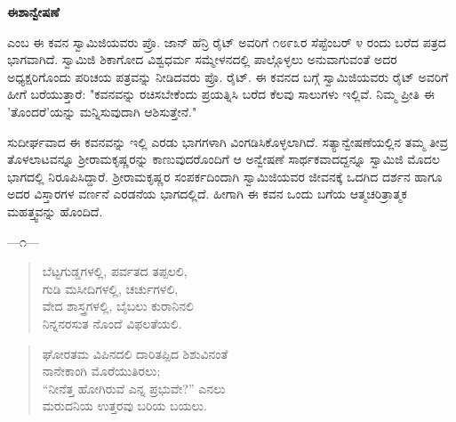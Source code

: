 

\selectkan

\begin{center}
\textbf{ಈಶಾನ್ವೇಷಣೆ}
\end{center}

 ಎಂಬ ಈ ಕವನ ಸ್ವಾಮಿಜಿಯವರು ಪ್ರೊ. ಜಾನ್ ಹೆನ್ರಿ ರೈಟ್ ಅವರಿಗೆ ೧೮೯೩ರ ಸೆಪ್ಟೆಂಬರ್ ೪ ರಂದು ಬರೆದ ಪತ್ರದ ಭಾಗವಾಗಿದೆ. ಸ್ವಾಮಿಜಿ ಶಿಕಾಗೋದ ವಿಶ್ವಧರ್ಮ ಸಮ್ಮೇಳನದಲ್ಲಿ ಪಾಲ್ಗೊಳ್ಳಲು ಅನುವಾಗುವಂತೆ ಅದರ ಅಧ್ಯಕ್ಷರಿಗೊಂದು ಪರಿಚಯ ಪತ್ರವನ್ನು ನೀಡಿದವರು ಪ್ರೊ. ರೈಟ್. ಈ ಕವನದ ಬಗ್ಗೆ ಸ್ವಾಮಿಜಿಯವರು ರೈಟ್ ಅವರಿಗೆ ಹೀಗೆ ಬರೆಯುತ್ತಾರೆ: "ಕವನವನ್ನು ರಚಿಸಬೇಕೆಂದು ಪ್ರಯತ್ನಿಸಿ ಬರೆದ ಕೆಲವು ಸಾಲುಗಳು ಇಲ್ಲಿವೆ. ನಿಮ್ಮ ಪ್ರೀತಿ ಈ 'ತೊಂದರೆ'ಯನ್ನು ಮನ್ನಿಸುವುದಾಗಿ ಆಶಿಸುತ್ತೇನೆ."

ಸುದೀರ್ಘವಾದ ಈ ಕವನವನ್ನು ಇಲ್ಲಿ ಎರಡು ಭಾಗಗಳಾಗಿ ವಿಂಗಡಿಸಿಕೊಳ್ಳಲಾಗಿದೆ. ಸತ್ಯಾನ್ವೇಷಣೆಯಲ್ಲಿನ ತಮ್ಮ ತೀವ್ರ ತೊಳಲಾಟವನ್ನೂ ಶ‍್ರೀರಾಮಕೃಷ್ಣರನ್ನು ಕಾಣುವುದರೊಂದಿಗೆ ಆ ಅನ್ವೇಷಣೆ ಸಾರ್ಥಕವಾದದ್ದನ್ನೂ ಸ್ವಾಮಿಜಿ ಮೊದಲ ಭಾಗದಲ್ಲಿ ನಿರೂಪಿಸಿದ್ದಾರೆ. ಶ‍್ರೀರಾಮಕೃಷ್ಣರ ಸಂಪರ್ಕದಿಂದಾಗಿ ಸ್ವಾಮಿಜಿಯವರ ಜೀವನಕ್ಕೆ ಒದಗಿದ ದರ್ಶನ ಹಾಗೂ ಅದರ ವಿಸ್ತಾರಗಳ ವರ್ಣನೆ ಎರಡನೆಯ ಭಾಗದಲ್ಲಿದೆ. ಹೀಗಾಗಿ ಈ ಕವನ ಒಂದು ಬಗೆಯ ಆತ್ಮಚರಿತ್ರಾತ್ಮಕ ಮಹತ್ತ್ವವನ್ನು ಹೊಂದಿದೆ.

\begin{center}
—೧—
\end{center}

\begin{verse}
ಬೆಟ್ಟಗುಡ್ಡಗಳಲ್ಲಿ, ಪರ್ವತದ ತಪ್ಪಲಲಿ,\\ಗುಡಿ ಮಸೀದಿಗಳಲ್ಲಿ, ಚರ್ಚುಗಳಲಿ,\\ವೇದ ಶಾಸ್ತ್ರಗಳಲ್ಲಿ, ಬೈಬಲು ಕುರಾನಿನಲಿ\\ನಿನ್ನನರಸುತ ನೊಂದೆ ವಿಫಲತೆಯಲಿ.
\end{verse}

\begin{verse}
ಘೋರತಮ ವಿಪಿನದಲಿ ದಾರಿತಪ್ಪಿದ ಶಿಶುವಿನಂತೆ\\ನಾನೇಕಾಂಗಿ ಮೊರೆಯುತಿರಲು;\\“ನೀನೆತ್ತ ಹೋಗಿರುವೆ ಎನ್ನ ಪ್ರಭುವೇ?” ಎನಲು\\ಮರುದನಿಯ ಉತ್ತರವು ಬರಿಯ ಬಯಲು.
\end{verse}

